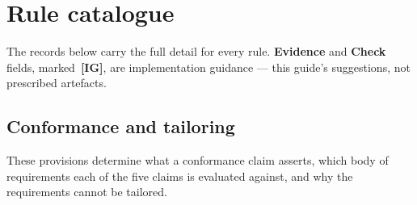 \documentclass[11pt,a4paper]{report}
\newcommand{\ig}{\textcolor{amber}{\sffamily\bfseries\scriptsize\,[IG]}}
\begin{document}
\chapter{Rule catalogue}

The records below carry the full detail for every rule. \textbf{Evidence} and
\textbf{Check} fields, marked \ig, are implementation guidance --- this guide's
suggestions, not prescribed artefacts.

\section{Conformance and tailoring}

These provisions determine what a conformance claim asserts, which body of requirements each of the five claims is evaluated against, and why the requirements cannot be tailored.
\end{document}
